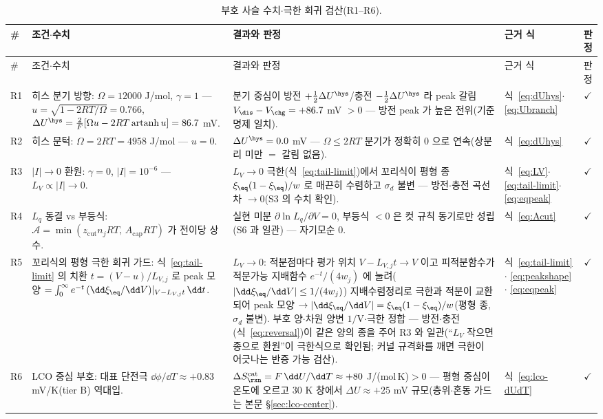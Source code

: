 \begin{longtable}{@{}l p{6.2cm} p{5.0cm} p{2.2cm} c@{}}
\caption{부호 사슬 수치$\cdot$극한 회귀 검산(R1--R6).}\label{tab:signcheck-R}\\
\toprule
\# & 조건$\cdot$수치 & 결과와 판정 & 근거 식 & 판정 \\
\midrule
\endfirsthead
\toprule
\# & 조건$\cdot$수치 & 결과와 판정 & 근거 식 & 판정 \\
\midrule
\endhead
R1 & 히스 분기 방향: $\Omega=12000$ J/mol, $\gamma=1$ ---
$u=\sqrt{1-2RT/\Omega}=0.766$, $\Delta U^\hys=\frac{2}{F}[\Omega u-2RT\,\mathrm{artanh}\,u]=86.7$ mV.
& 분기 중심이 방전 $+\tfrac12\Delta U^\hys$/충전 $-\tfrac12\Delta U^\hys$ 라 peak 갈림
$V_\dis-V_\chg=+86.7$ mV $>0$ --- 방전 peak 가 높은 전위(기준 명제 일치).
& 식~\eqref{eq:dUhys}$\cdot$ \eqref{eq:Ubranch} & $\checkmark$ \\
R2 & 히스 문턱: $\Omega=2RT=4958$ J/mol --- $u=0$.
& $\Delta U^\hys=0.0$ mV --- $\Omega\le2RT$ 분기가 정확히 $0$ 으로 연속(상분리 미만 $=$ 갈림 없음).
& 식~\eqref{eq:dUhys} & $\checkmark$ \\
R3 & $|I|\!\to\!0$ 환원: $\gamma=0$, $|I|=10^{-6}$ --- $L_V\propto|I|\to0$.
& $L_V\to0$ 극한(식~\eqref{eq:tail-limit})에서 꼬리식이 평형 종 $\xi_\eq(1-\xi_\eq)/w$ 로 매끈히 수렴하고 $\sigma_d$ 불변 ---
방전$\cdot$충전 곡선 차 $\to0$(S3 의 수치 확인).
& 식~\eqref{eq:LV}$\cdot$ \eqref{eq:tail-limit}$\cdot$\eqref{eq:eqpeak} & $\checkmark$ \\
R4 & $L_q$ 동결 vs 부등식: $\mathcal A=\min(z_\mathrm{cut}n_jRT,\,A_\mathrm{cap}RT)$ 가 전이당 상수.
& 실현 미분 $\partial\ln L_q/\partial V=0$, 부등식 $<0$ 은 컷 규칙 동기로만 성립(S6 과 일관) ---
자기모순 $0$. & 식~\eqref{eq:Acut} & $\checkmark$ \\
R5 & 꼬리식의 평형 극한 회귀 가드: 식~\eqref{eq:tail-limit} 의 치환 $t=(V-u)/L_{V,j}$ 로
peak 모양 $=\int_0^\infty e^{-t}\,(\dd\xi_\eq/\dd V)|_{V-L_{V,j}t}\,\dd t$.
& $L_V\to0$: 적분점마다 평가 위치 $V-L_{V,j}t\to V$ 이고 피적분함수가 적분가능 지배함수 $e^{-t}/(4w_j)$ 에
눌려($|\dd\xi_\eq/\dd V|\le1/(4w_j)$) 지배수렴정리로 극한과 적분이 교환되어 peak 모양
$\to|\dd\xi_\eq/\dd V|=\xi_\eq(1-\xi_\eq)/w$(평형 종, $\sigma_d$ 불변). 부호 양$\cdot$차원 양변 $1/$V$\cdot$극한 정합
--- 방전$\cdot$충전(식~\eqref{eq:reversal})이 같은 양의 종을 주어 R3 와 일관(``$L_V$ 작으면 종으로 환원''이
극한식으로 확인됨; 커널 규격화를 깨면 극한이 어긋나는 반증 가능 검산).
& 식~\eqref{eq:tail-limit}$\cdot$ \eqref{eq:peakshape}$\cdot$ \eqref{eq:eqpeak} & $\checkmark$ \\
R6 & LCO 중심 부호: 대표 단전극 $\dd\phi/\dd T\approx+0.83$ mV/K(tier B)\cite{swiderska2019} 역대입.
& $\Delta S_{\rxn}^\mathrm{cat}=F\,\dd U/\dd T\approx+80$ J/(mol\,K)$>0$ --- 평형 중심이 온도에 오르고
$30$ K 창에서 $\Delta U\approx+25$ mV 규모(층위$\cdot$혼동 가드는 본문 \S\ref{sec:lco-center}).
& 식~\eqref{eq:lco-dUdT} & $\checkmark$ \\
\bottomrule
\end{longtable}

